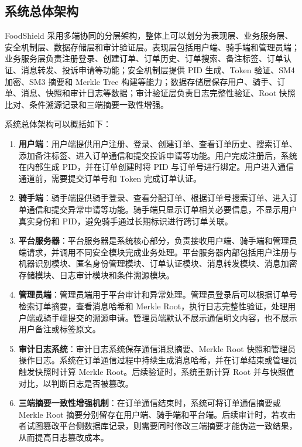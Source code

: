 \subsection{系统总体架构}

FoodShield 采用多端协同的分层架构，整体上可以划分为表现层、业务服务层、安全机制层、数据存储层和审计验证层。表现层包括用户端、骑手端和管理员端；业务服务层负责注册登录、创建订单、订单历史、订单搜索、备注标签、订单认证、消息转发、投诉申请等功能；安全机制层提供 PID 生成、Token 验证、SM4 加密、SM3 摘要和 Merkle Tree 构建等能力；数据存储层保存用户、骑手、订单、消息、快照和审计日志等数据；审计验证层负责日志完整性验证、Root 快照比对、条件溯源记录和三端摘要一致性增强。



系统总体架构可以概括如下：

\begin{enumerate}[label=\arabic*., leftmargin=2em]
\item \textbf{用户端}：用户端提供用户注册、登录、创建订单、查看订单历史、搜索订单、添加备注标签、进入订单通信和提交投诉申请等功能。用户完成注册后，系统在内部生成 PID，并在订单创建时将 PID 与订单号进行绑定。用户进入通信通道前，需要提交订单号和 Token 完成订单认证。

\item \textbf{骑手端}：骑手端提供骑手登录、查看分配订单、根据订单号搜索订单、进入订单通信和提交异常申请等功能。骑手端只显示订单相关必要信息，不显示用户真实身份和 PID，避免骑手通过长期标识进行跨订单关联。

\item \textbf{平台服务器}：平台服务器是系统核心部分，负责接收用户端、骑手端和管理员端请求，并调用不同安全模块完成业务处理。平台服务器内部包括用户注册与机器识别模块、匿名身份管理模块、订单认证模块、消息转发模块、消息加密存储模块、日志审计模块和条件溯源模块。

\item \textbf{管理员端}：管理员端用于平台审计和异常处理。管理员登录后可以根据订单号检索订单摘要，查看消息哈希和 Merkle Root，执行日志完整性验证，处理用户端或骑手端提交的溯源申请。管理员端默认不展示通信明文内容，也不展示用户备注或标签原文。

\item \textbf{审计日志系统}：审计日志系统保存通信消息摘要、Merkle Root 快照和管理员操作日志。系统在订单通信过程中持续生成消息哈希，并在订单结束或管理员触发快照时计算 Merkle Root。后续验证时，系统重新计算 Root 并与快照值对比，以判断日志是否被篡改。

\item \textbf{三端摘要一致性增强机制}：在订单通信结束时，系统可将订单通信摘要或 Merkle Root 摘要分别留存在用户端、骑手端和平台端。后续审计时，若攻击者试图篡改平台侧数据库记录，则需要同时修改三端摘要才能伪造一致结果，从而提高日志篡改成本。
\end{enumerate}

